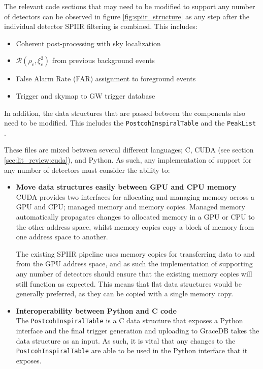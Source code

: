 \documentclass{article}
\begin{document}
The relevant code sections that may need to be modified to support any number of detectors can be observed in figure \ref{fig:spiir_structure} as any step after the individual detector SPIIR filtering is combined.
This includes:
\begin{itemize}
    \item Coherent post-processing with sky localization\\ \cite[\texttt{gstlal-spiir/gst/cuda/postcoh/}]{spiir}
    \item \(\mathcal{R}(\rho_c,\xi^2_c)\) from previous background events\\ \cite[\texttt{gstlal-spiir/gst/cuda/cohfar/cohfar\_accumbackground.c}]{spiir}
    \item False Alarm Rate (FAR) assignment to foreground events\\ \cite[\texttt{gstlal-spiir/gst/cuda/cohfar/cohfar\_assignfar.c}]{spiir}
    \item Trigger and skymap to GW trigger database\\ \cite[\texttt{gstlal-spiir/python/pipemodules/postcoh\_finalsink.py}]{spiir}
\end{itemize}

In addition, the data structures that are passed between the components also need to be modified.
This includes the \texttt{PostcohInspiralTable} \cite[\texttt{gstlal-spiir/python/pipemodules/postcohtable/}]{spiir} and the \texttt{PeakList} \cite[\texttt{gstlal-spiir/gst/cuda/postcoh/postcoh.h}]{spiir}.

These files are mixed between several different languages; C, CUDA (see section \ref{sec:lit_review:cuda}), and Python.
As such, any implementation of support for any number of detectors must consider the ability to:
\begin{itemize}
    \item \textbf{Move data structures easily between GPU and CPU memory}\\
        CUDA provides two interfaces for allocating and managing memory across a GPU and CPU; managed memory and memory copies.
        Managed memory automatically propagates changes to allocated memory in a GPU or CPU to the other address space, whilst memory copies copy a block of memory from one address space to another.
 
        The existing SPIIR pipeline uses memory copies for transferring data to and from the GPU address space, and as such the implementation of supporting any number of detectors should ensure that the existing memory copies will still function as expected.
        This means that flat data structures would be generally preferred, as they can be copied with a single memory copy.

    \item \textbf{Interoperability between Python and C code}\\
        The \texttt{PostcohInspiralTable} is a C data structure that exposes a Python interface and the final trigger generation and uploading to GraceDB takes the data structure as an input.
        As such, it is vital that any changes to the \texttt{PostcohInspiralTable} are able to be used in the Python interface that it exposes.
\end{itemize}
\end{document}
